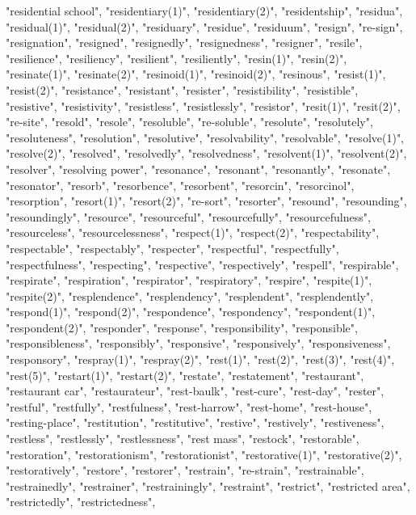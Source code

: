 "residential school",
"residentiary(1)",
"residentiary(2)",
"residentship",
"residua",
"residual(1)",
"residual(2)",
"residuary",
"residue",
"residuum",
"resign",
"re-sign",
"resignation",
"resigned",
"resignedly",
"resignedness",
"resigner",
"resile",
"resilience",
"resiliency",
"resilient",
"resiliently",
"resin(1)",
"resin(2)",
"resinate(1)",
"resinate(2)",
"resinoid(1)",
"resinoid(2)",
"resinous",
"resist(1)",
"resist(2)",
"resistance",
"resistant",
"resister",
"resistibility",
"resistible",
"resistive",
"resistivity",
"resistless",
"resistlessly",
"resistor",
"resit(1)",
"resit(2)",
"re-site",
"resold",
"resole",
"resoluble",
"re-soluble",
"resolute",
"resolutely",
"resoluteness",
"resolution",
"resolutive",
"resolvability",
"resolvable",
"resolve(1)",
"resolve(2)",
"resolved",
"resolvedly",
"resolvedness",
"resolvent(1)",
"resolvent(2)",
"resolver",
"resolving power",
"resonance",
"resonant",
"resonantly",
"resonate",
"resonator",
"resorb",
"resorbence",
"resorbent",
"resorcin",
"resorcinol",
"resorption",
"resort(1)",
"resort(2)",
"re-sort",
"resorter",
"resound",
"resounding",
"resoundingly",
"resource",
"resourceful",
"resourcefully",
"resourcefulness",
"resourceless",
"resourcelessness",
"respect(1)",
"respect(2)",
"respectability",
"respectable",
"respectably",
"respecter",
"respectful",
"respectfully",
"respectfulness",
"respecting",
"respective",
"respectively",
"respell",
"respirable",
"respirate",
"respiration",
"respirator",
"respiratory",
"respire",
"respite(1)",
"respite(2)",
"resplendence",
"resplendency",
"resplendent",
"resplendently",
"respond(1)",
"respond(2)",
"respondence",
"respondency",
"respondent(1)",
"respondent(2)",
"responder",
"response",
"responsibility",
"responsible",
"responsibleness",
"responsibly",
"responsive",
"responsively",
"responsiveness",
"responsory",
"respray(1)",
"respray(2)",
"rest(1)",
"rest(2)",
"rest(3)",
"rest(4)",
"rest(5)",
"restart(1)",
"restart(2)",
"restate",
"restatement",
"restaurant",
"restaurant car",
"restaurateur",
"rest-baulk",
"rest-cure",
"rest-day",
"rester",
"restful",
"restfully",
"restfulness",
"rest-harrow",
"rest-home",
"rest-house",
"resting-place",
"restitution",
"restitutive",
"restive",
"restively",
"restiveness",
"restless",
"restlessly",
"restlessness",
"rest mass",
"restock",
"restorable",
"restoration",
"restorationism",
"restorationist",
"restorative(1)",
"restorative(2)",
"restoratively",
"restore",
"restorer",
"restrain",
"re-strain",
"restrainable",
"restrainedly",
"restrainer",
"restrainingly",
"restraint",
"restrict",
"restricted area",
"restrictedly",
"restrictedness",

